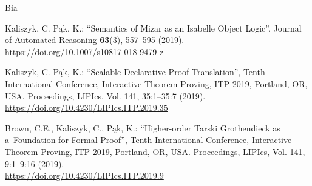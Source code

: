 \begin{sitedescription}{Bia}
\begin{compactitem}
\item Kaliszyk, C. Pąk, K.: ``Semantics of Mizar as an Isabelle Object Logic''.
Journal of Automated Reasoning \textbf{63}(3), 557--595 (2019).
\\\url{https://doi.org/10.1007/s10817-018-9479-z}

\item Kaliszyk, C. Pąk, K.: ``Scalable Declarative Proof Translation'',
Tenth International Conference, Interactive Theorem Proving, ITP 2019, Portland,
OR, USA. Proceedings,  LIPIcs, Vol. 141, 35:1--35:7 (2019).
\\\url{https://doi.org/10.4230/LIPIcs.ITP.2019.35}

\item Brown, C.E., Kaliszyk, C., Pąk, K.: ``Higher-order Tarski Grothendieck as a~Foundation for Formal Proof'',
Tenth International Conference, Interactive Theorem Proving, ITP 2019, Portland,
OR, USA. Proceedings,  LIPIcs, Vol. 141, 9:1--9:16 (2019).
\\\url{https://doi.org/10.4230/LIPIcs.ITP.2019.9}

\end{compactitem}

\end{sitedescription}


